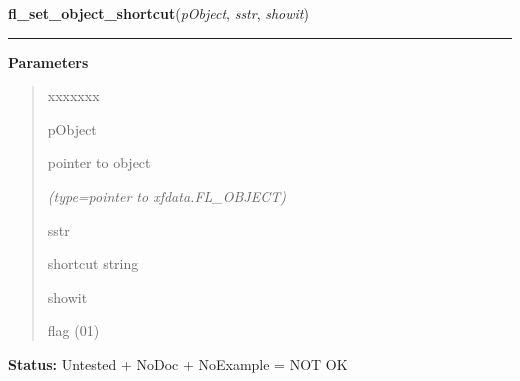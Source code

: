\hspace{.8\funcindent}\begin{boxedminipage}{\funcwidth}

    \raggedright \textbf{fl\_set\_object\_shortcut}(\textit{pObject}, \textit{sstr}, \textit{showit})

    \vspace{-1.5ex}

    \rule{\textwidth}{0.5\fboxrule}
\setlength{\parskip}{2ex}
\setlength{\parskip}{1ex}
      \textbf{Parameters}
      \vspace{-1ex}

      \begin{quote}
        \begin{Ventry}{xxxxxxx}

          \item[pObject]

          pointer to object

            {\it (type=pointer to xfdata.FL\_OBJECT)}

          \item[sstr]

          shortcut string

          \item[showit]

          flag (0{\textbar}1)

        \end{Ventry}

      \end{quote}

\textbf{Status:} Untested + NoDoc + NoExample = NOT OK



    \end{boxedminipage}

    \label{xformslib:library:fl_set_object_shortcutkey}

    \vspace{0.5ex}

